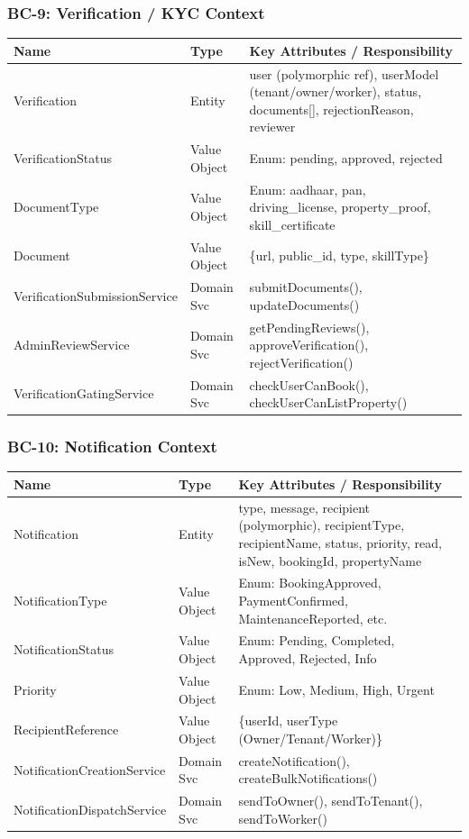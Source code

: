 \documentclass[12pt,a4paper]{article}
\begin{document}
\subsubsection{BC-9: Verification / KYC Context}

\begin{center}
\begin{tabular}{@{}p{3.5cm}p{2cm}p{8.5cm}@{}}
\toprule
\textbf{Name} & \textbf{Type} & \textbf{Key Attributes / Responsibility} \\
\midrule
Verification & Entity & user (polymorphic ref), userModel (tenant/owner/worker), status, documents[], rejectionReason, reviewer \\
VerificationStatus & Value Object & Enum: pending, approved, rejected \\
DocumentType & Value Object & Enum: aadhaar, pan, driving\_license, property\_proof, skill\_certificate \\
Document & Value Object & \{url, public\_id, type, skillType\} \\
VerificationSubmissionService & Domain Svc & submitDocuments(), updateDocuments() \\
AdminReviewService & Domain Svc & getPendingReviews(), approveVerification(), rejectVerification() \\
VerificationGatingService & Domain Svc & checkUserCanBook(), checkUserCanListProperty() \\
\bottomrule
\end{tabular}
\end{center}

\subsubsection{BC-10: Notification Context}

\begin{center}
\begin{tabular}{@{}p{3.5cm}p{2cm}p{8.5cm}@{}}
\toprule
\textbf{Name} & \textbf{Type} & \textbf{Key Attributes / Responsibility} \\
\midrule
Notification & Entity & type, message, recipient (polymorphic), recipientType, recipientName, status, priority, read, isNew, bookingId, propertyName \\
NotificationType & Value Object & Enum: BookingApproved, PaymentConfirmed, MaintenanceReported, etc. \\
NotificationStatus & Value Object & Enum: Pending, Completed, Approved, Rejected, Info \\
Priority & Value Object & Enum: Low, Medium, High, Urgent \\
RecipientReference & Value Object & \{userId, userType (Owner/Tenant/Worker)\} \\
NotificationCreationService & Domain Svc & createNotification(), createBulkNotifications() \\
NotificationDispatchService & Domain Svc & sendToOwner(), sendToTenant(), sendToWorker() \\
\bottomrule
\end{tabular}
\end{center}
\end{document}
